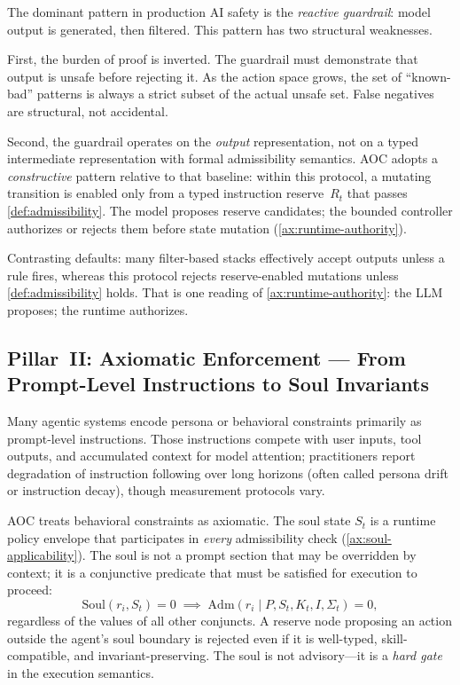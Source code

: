 \documentclass[11pt]{article}
\theoremstyle{remark}
\newcommand{\AOC}{\textup{\textsc{AOC}}}
\newcommand{\Adm}{\mathrm{Adm}}
\newcommand{\Soul}{\mathrm{Soul}}
\begin{document}
The dominant pattern in production AI safety is the \emph{reactive guardrail}: model output is generated, then filtered. This pattern has two structural weaknesses.

First, the burden of proof is inverted. The guardrail must demonstrate that output is unsafe before rejecting it. As the action space grows, the set of ``known-bad'' patterns is always a strict subset of the actual unsafe set. False negatives are structural, not accidental.

Second, the guardrail operates on the \emph{output} representation, not on a typed intermediate representation with formal admissibility semantics. \AOC{} adopts a \emph{constructive} pattern relative to that baseline: within this protocol, a mutating transition is enabled only from a typed instruction reserve~$R_t$ that passes \cref{def:admissibility}. The model proposes reserve candidates; the bounded controller authorizes or rejects them before state mutation (\cref{ax:runtime-authority}).

Contrasting defaults: many filter-based stacks effectively accept outputs unless a rule fires, whereas this protocol rejects reserve-enabled mutations unless \cref{def:admissibility} holds. That is one reading of \cref{ax:runtime-authority}: the LLM proposes; the runtime authorizes.

\subsection[Pillar~II: Axiomatic Enforcement]{Pillar~II: Axiomatic Enforcement --- From Prompt-Level Instructions to Soul Invariants}

Many agentic systems encode persona or behavioral constraints primarily as prompt-level instructions. Those instructions compete with user inputs, tool outputs, and accumulated context for model attention; practitioners report degradation of instruction following over long horizons (often called persona drift or instruction decay), though measurement protocols vary.

\AOC{} treats behavioral constraints as axiomatic. The soul state $S_t$ is a runtime policy envelope that participates in \emph{every} admissibility check (\cref{ax:soul-applicability}). The soul is not a prompt section that may be overridden by context; it is a conjunctive predicate that must be satisfied for execution to proceed:
\[
\Soul(r_i, S_t) = 0 \;\implies\; \Adm(r_i \mid P, S_t, K_t, I, \Sigma_t) = 0,
\]
regardless of the values of all other conjuncts. A reserve node proposing an action outside the agent's soul boundary is rejected even if it is well-typed, skill-compatible, and invariant-preserving. The soul is not advisory---it is a \emph{hard gate} in the execution semantics.
\end{document}
